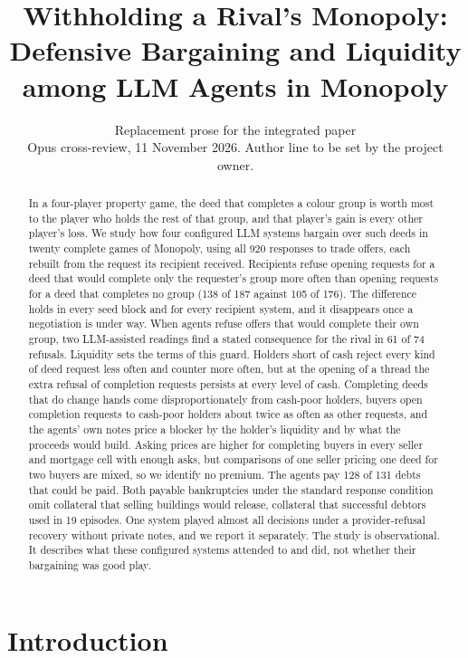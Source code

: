 \documentclass[11pt,letterpaper]{article}
\title{Withholding a Rival's Monopoly:\\Defensive Bargaining and Liquidity among LLM Agents in Monopoly}
\author{Replacement prose for the integrated paper\\{\small Opus cross-review, 11 November 2026. Author line to be set by the project owner.}}
\date{}
\begin{document}
\maketitle

\begin{abstract}
In a four-player property game, the deed that completes a colour group is worth most to the player who holds the rest of that group, and that player's gain is every other player's loss. We study how four configured LLM systems bargain over such deeds in twenty complete games of Monopoly, using all 920 responses to trade offers, each rebuilt from the request its recipient received. Recipients refuse opening requests for a deed that would complete only the requester's group more often than opening requests for a deed that completes no group (138 of 187 against 105 of 176). The difference holds in every seed block and for every recipient system, and it disappears once a negotiation is under way. When agents refuse offers that would complete their own group, two LLM-assisted readings find a stated consequence for the rival in 61 of 74 refusals. Liquidity sets the terms of this guard. Holders short of cash reject every kind of deed request less often and counter more often, but at the opening of a thread the extra refusal of completion requests persists at every level of cash. Completing deeds that do change hands come disproportionately from cash-poor holders, buyers open completion requests to cash-poor holders about twice as often as other requests, and the agents' own notes price a blocker by the holder's liquidity and by what the proceeds would build. Asking prices are higher for completing buyers in every seller and mortgage cell with enough asks, but comparisons of one seller pricing one deed for two buyers are mixed, so we identify no premium. The agents pay 128 of 131 debts that could be paid. Both payable bankruptcies under the standard response condition omit collateral that selling buildings would release, collateral that successful debtors used in 19 episodes. One system played almost all decisions under a provider-refusal recovery without private notes, and we report it separately. The study is observational. It describes what these configured systems attended to and did, not whether their bargaining was good play.
\end{abstract}

\section{Introduction}
\label{sec:intro}
\end{document}
